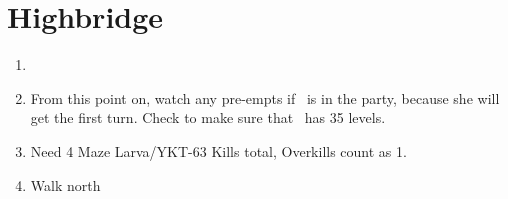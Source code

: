 \chapter{Highbridge}
\begin{spheregrid}
    \begin{itemize}
        \yunaf
    \end{itemize}
\end{spheregrid}
\begin{enumerate}
    \item \formation{\tidus}{\yuna}{\wakka}
    \item From this point on, watch any pre-empts if \yuna\ is in the party, because she will get the first turn. Check to make sure that \lulu\ has 35 levels.
    \item Need 4 Maze Larva/YKT-63 Kills total, Overkills count as 1.
    \item Walk north
\end{enumerate}
